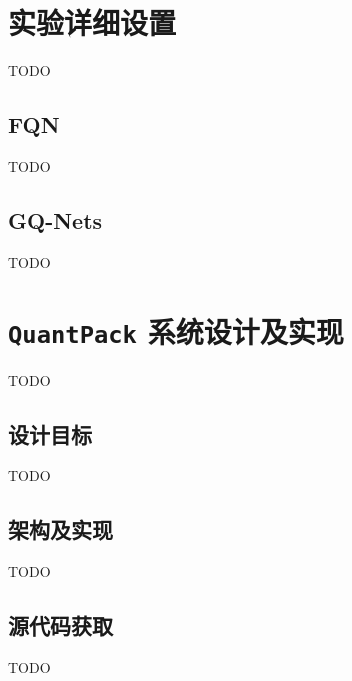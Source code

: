 \chapter{实验详细设置}
TODO
\section{FQN}
TODO
\section{GQ-Nets}
TODO

\chapter{\texttt{QuantPack} 系统设计及实现}
TODO
\section{设计目标}
TODO
\section{架构及实现}
TODO
\section{源代码获取}
TODO
